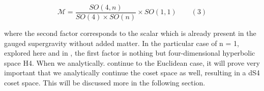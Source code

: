 \documentclass{article}
\begin{document}
\begin{equation}
\mathcal { M } = \frac { S O ( 4, n ) } { S O ( 4 ) \times S O ( n ) } \times S O ( 1, 1 ) \qquad ( 3 )
\end{equation}


where the second factor corresponds to the scalar  which is already present in the gauged
supergravity without added matter. In the particular case of n = 1, explored here and in ,
the first factor is nothing but four-dimensional hyperbolic space H4. When we analytically.
continue to the Euclidean case, it will prove very important that we analytically continue
the coset space as well, resulting in a dS4 coset space. This will be discussed more in the
following section.
\end{document}
